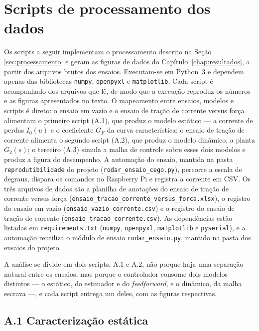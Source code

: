 \chapter{Scripts de processamento dos dados}
\label{apendice:codigos}

Os scripts a seguir implementam o processamento descrito na Seção
\ref{sec:processamento} e geram as figuras de dados do
Capítulo~\ref{chap:resultados}, a partir dos arquivos brutos dos ensaios. Executam-se em
Python~3 e dependem apenas das bibliotecas \texttt{numpy}, \texttt{openpyxl} e
\texttt{matplotlib}. Cada script é acompanhado dos arquivos que lê, de modo que a
execução reproduz os números e as figuras apresentados no texto. O mapeamento entre
ensaios, modelos e scripts é direto: o ensaio em vazio e o ensaio de tração de corrente
versus força alimentam o primeiro script (A.1), que produz o modelo estático --- a
corrente de perdas $I_0(u)$ e o coeficiente $G_F$ da curva característica; o ensaio de
tração de corrente alimenta o segundo script (A.2), que produz o modelo dinâmico, a
planta $G_2(s)$; o terceiro (A.3) simula a malha de controle sobre esses dois modelos e
produz a figura do desempenho. A automação do ensaio, mantida na pasta
\texttt{reprodutibilidade} do projeto (\texttt{rodar\_ensaio\_cego.py}), percorre a
escala de degraus, dispara os comandos no Raspberry Pi e registra a corrente em CSV. Os
três arquivos de dados são a planilha de anotações do ensaio de tração de corrente versus
força (\texttt{ensaio\_tracao\_corrente\_versus\_forca.xlsx}), o registro do ensaio em vazio (\texttt{ensaio\_vazio\_corrente.csv}) e o registro do ensaio de tração de corrente
(\texttt{ensaio\_tracao\_corrente.csv}). As dependências estão listadas em
\texttt{requirements.txt} (\texttt{numpy}, \texttt{openpyxl}, \texttt{matplotlib} e
\texttt{pyserial}), e a automação reutiliza o módulo de ensaio
\texttt{rodar\_ensaio.py}, mantido na pasta dos ensaios do projeto.

A análise se divide em dois scripts, A.1 e A.2, não porque haja uma separação natural
entre os ensaios, mas porque o controlador consome dois modelos distintos --- o estático,
do estimador e do \emph{feedforward}, e o dinâmico, da malha escrava ---, e cada script
entrega um deles, com as figuras respectivas.

\section*{\normalsize A.1 Caracterização estática}


